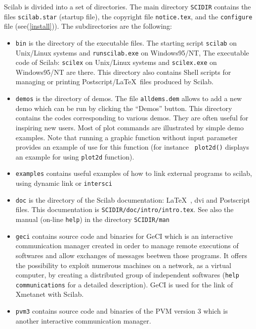 Scilab is divided into a set of directories. The main directory
\verb!SCIDIR! contains the files {\tt scilab.star} (startup file), the
copyright file {\tt notice.tex}, and the \verb!configure! file
(see(\ref{install})).
The subdirectories are the following:
\begin{itemize}

\item{{\tt bin} is the directory of the executable files.
The starting script {\tt scilab} on Unix/Linux systems and {\tt runscilab.exe} on Windows95/NT, The executable code of Scilab: {\tt scilex} on Unix/Linux systems and {\tt scilex.exe} on Windows95/NT are there. 
This directory also contains Shell scripts 
for managing or printing Postscript/\LaTeX\  files produced by Scilab.}

\item{{\tt demos} is the directory of demos. The file 
{\tt alldems.dem} allows to add a new demo which can be run by 
clicking the ``Demos'' button. 
This directory contains the codes corresponding
to various demos. They are often useful for inspiring new users.
Most of plot commands are illustrated by simple demo examples. 
Note that running a graphic function without input parameter
provides an example of use for this function (for instance {\tt
plot2d()} displays an example for using {\tt plot2d}  function). }

\item{{\tt examples} contains useful examples of how to link
external programs to scilab, using dynamic link or {\tt intersci}}

\item{{\tt doc} is the directory of the Scilab documentation: \LaTeX\ , dvi 
and Postscript files. 
This documentation is {\tt SCIDIR/doc/intro/intro.tex}. See 
also the manual (on-line {\tt help}) in the directory {\tt SCIDIR/man}}

\item{{\tt geci} contains source code and binaries for GeCI which is an 
interactive communication manager created in order to
manage remote executions of softwares and allow exchanges of messages
beetwen those programs. It offers the possibility to exploit numerous
machines on a network, as a virtual computer, by creating a
distributed group of independent softwares 
(\verb!help communications! for a detailed description).
GeCI is used for the link of Xmetanet with Scilab.}

\item{\tt pvm3} contains source code and binaries of the PVM version
3 which is another interactive communication manager. 


\end{itemize}
